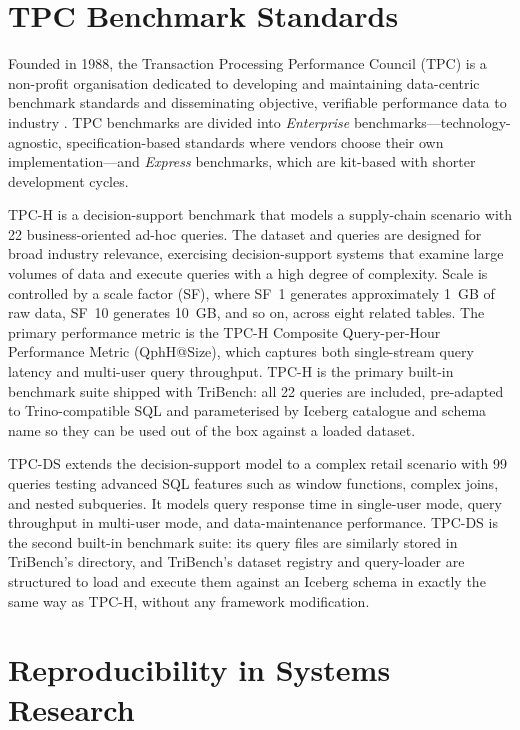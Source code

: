 \documentclass{l4proj}
\begin{document}
\section{TPC Benchmark Standards}
\label{sec:tpc}

Founded in 1988, the Transaction Processing Performance Council (TPC) is a non-profit organisation dedicated to developing and maintaining data-centric benchmark standards and disseminating objective, verifiable performance data to industry \citep{tpch2023}. TPC benchmarks are divided into \emph{Enterprise} benchmarks---technology-agnostic, specification-based standards where vendors choose their own implementation---and \emph{Express} benchmarks, which are kit-based with shorter development cycles.

TPC-H \citep{tpch2023} is a decision-support benchmark that models a supply-chain scenario with 22 business-oriented ad-hoc queries. The dataset and queries are designed for broad industry relevance, exercising decision-support systems that examine large volumes of data and execute queries with a high degree of complexity. Scale is controlled by a scale factor (SF), where SF~1 generates approximately \SI{1}{GB} of raw data, SF~10 generates \SI{10}{GB}, and so on, across eight related tables. The primary performance metric is the TPC-H Composite Query-per-Hour Performance Metric (QphH@Size), which captures both single-stream query latency and multi-user query throughput. TPC-H is the primary built-in benchmark suite shipped with TriBench: all 22 queries are included, pre-adapted to Trino-compatible SQL and parameterised by Iceberg catalogue and schema name so they can be used out of the box against a loaded dataset.

TPC-DS \citep{tpcds2021} extends the decision-support model to a complex retail scenario with 99 queries testing advanced SQL features such as window functions, complex joins, and nested subqueries. It models query response time in single-user mode, query throughput in multi-user mode, and data-maintenance performance. TPC-DS is the second built-in benchmark suite: its query files are similarly stored in TriBench's directory, and TriBench's dataset registry and query-loader are structured to load and execute them against an Iceberg schema in exactly the same way as TPC-H, without any framework modification.


\section{Reproducibility in Systems Research}
\label{sec:reproducibility}
\end{document}
